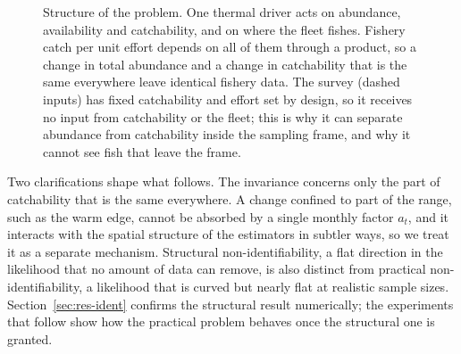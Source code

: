 \documentclass[11pt,a4paper]{article}
\begin{document}
\begin{figure}[tb]
\centering
{}
\caption{Structure of the problem. One thermal driver acts on abundance, availability and catchability, and on where the fleet fishes. Fishery catch per unit effort depends on all of them through a product, so a change in total abundance and a change in catchability that is the same everywhere leave identical fishery data. The survey (dashed inputs) has fixed catchability and effort set by design, so it receives no input from catchability or the fleet; this is why it can separate abundance from catchability inside the sampling frame, and why it cannot see fish that leave the frame.}
\label{fig:schematic}
\end{figure}

Two clarifications shape what follows. The invariance concerns only the part of catchability that is the same everywhere. A change confined to part of the range, such as the warm edge, cannot be absorbed by a single monthly factor $a_t$, and it interacts with the spatial structure of the estimators in subtler ways, so we treat it as a separate mechanism. Structural non-identifiability, a flat direction in the likelihood that no amount of data can remove, is also distinct from practical non-identifiability, a likelihood that is curved but nearly flat at realistic sample sizes. Section~\ref{sec:res-ident} confirms the structural result numerically; the experiments that follow show how the practical problem behaves once the structural one is granted.
\end{document}

